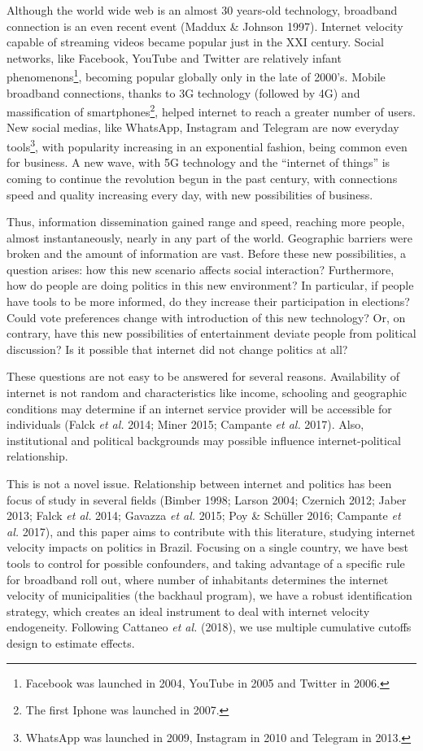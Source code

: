 \documentclass[
  12pt,
]{article}
\begin{document}
Although the world wide web is an almost 30 years-old technology,
broadband connection is an even recent event (Maddux \& Johnson 1997).
Internet velocity capable of streaming videos became popular just in the
XXI century. Social networks, like Facebook, YouTube and Twitter are
relatively infant phenomenons\footnote{Facebook was launched in 2004,
  YouTube in 2005 and Twitter in 2006.}, becoming popular globally only
in the late of 2000's. Mobile broadband connections, thanks to 3G
technology (followed by 4G) and massification of smartphones\footnote{The
  first Iphone was launched in 2007.}, helped internet to reach a
greater number of users. New social medias, like WhatsApp, Instagram and
Telegram are now everyday tools\footnote{WhatsApp was launched in 2009,
  Instagram in 2010 and Telegram in 2013.}, with popularity increasing
in an exponential fashion, being common even for business. A new wave,
with 5G technology and the ``internet of things'' is coming to continue
the revolution begun in the past century, with connections speed and
quality increasing every day, with new possibilities of business.

Thus, information dissemination gained range and speed, reaching more
people, almost instantaneously, nearly in any part of the world.
Geographic barriers were broken and the amount of information are vast.
Before these new possibilities, a question arises: how this new scenario
affects social interaction? Furthermore, how do people are doing
politics in this new environment? In particular, if people have tools to
be more informed, do they increase their participation in elections?
Could vote preferences change with introduction of this new technology?
Or, on contrary, have this new possibilities of entertainment deviate
people from political discussion? Is it possible that internet did not
change politics at all?

These questions are not easy to be answered for several reasons.
Availability of internet is not random and characteristics like income,
schooling and geographic conditions may determine if an internet service
provider will be accessible for individuals (Falck \emph{et al.} 2014;
Miner 2015; Campante \emph{et al.} 2017). Also, institutional and
political backgrounds may possible influence internet-political
relationship.

This is not a novel issue. Relationship between internet and politics
has been focus of study in several fields (Bimber 1998; Larson 2004;
Czernich 2012; Jaber 2013; Falck \emph{et al.} 2014; Gavazza \emph{et
al.} 2015; Poy \& Schüller 2016; Campante \emph{et al.} 2017), and this
paper aims to contribute with this literature, studying internet
velocity impacts on politics in Brazil. Focusing on a single country, we
have best tools to control for possible confounders, and taking
advantage of a specific rule for broadband roll out, where number of
inhabitants determines the internet velocity of municipalities (the
backhaul program), we have a robust identification strategy, which
creates an ideal instrument to deal with internet velocity endogeneity.
Following Cattaneo \emph{et al.} (2018), we use multiple cumulative
cutoffs design to estimate effects.
\end{document}
